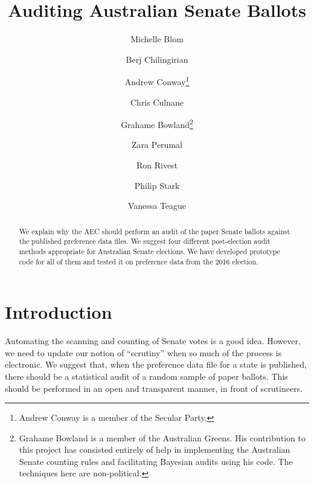 \documentclass[10pt,a4paper]{article}
\begin{document}


\title{Auditing Australian Senate Ballots}
\author[1]{Michelle Blom}
\author[2]{Berj Chilingirian}
\author[ ]{Andrew Conway\thanks{Andrew Conway is a member of the Secular Party.   }}
\author[1]{Chris Culnane}
\author[ ]{Grahame Bowland\thanks{Grahame Bowland is a member of the Australian Greens.  His contribution to this project has consisted entirely of help in implementing the Australian Senate counting rules and facilitating Bayesian audits using his code. The techniques here are non-political. }}
\author[2]{Zara Perumal}
\author[2]{Ron Rivest}
\author[3]{Philip Stark}
\author[1]{Vanessa Teague}
\maketitle

\tableofcontents

\begin{abstract}
We explain why the AEC should perform an audit of the paper Senate  ballots against the published preference data files.  We suggest four different post-election audit methods appropriate for Australian Senate elections.  We have developed prototype code for all of them and tested it on preference data from the 2016 election.  
\end{abstract}

\section{Introduction} Automating the scanning and counting of Senate votes is a good idea. However, we need to update our notion of  ``scrutiny'' when so much of the process is electronic.  We suggest that, when the preference data file for a state is published, there should be a statistical audit of a random sample of paper ballots.
This should be performed in an open and transparent manner, in front of scrutineers. 
\end{document}
